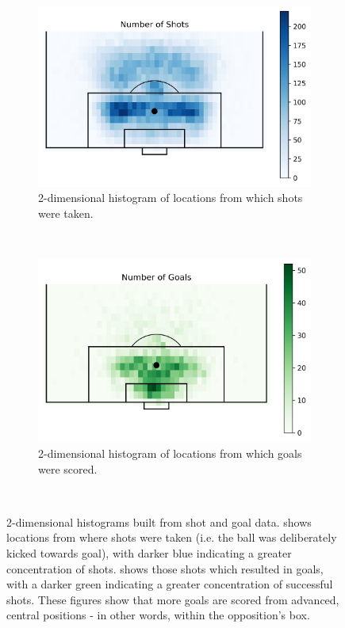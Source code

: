 \documentclass{l4proj}
\begin{document}
\begin{figure}[htb] 
    \centering
    \begin{subfigure}[b]{0.45\textwidth}
        \includegraphics[width=\textwidth]{images/shotplot.png}
        \caption{2-dimensional histogram of locations from which shots were taken.}
        \label{fig:splot}
    \end{subfigure}
    ~
    \begin{subfigure}[b]{0.45\textwidth}
        \includegraphics[width=\textwidth]{images/goalplot.png}
        \caption{2-dimensional histogram of locations from which goals were scored.}
        \label{fig:gplot}
    \end{subfigure}
    ~   
    \caption{2-dimensional histograms built from shot and goal data.  shows locations from where shots were taken (i.e. the ball was deliberately kicked towards goal), with darker blue indicating a greater concentration of shots.  shows those shots which resulted in goals, with a darker green indicating a greater concentration of successful shots. These figures show that more goals are scored from advanced, central positions - in other words, within the opposition's box.
    }\label{fig:histo1}
\end{figure}
\end{document}
